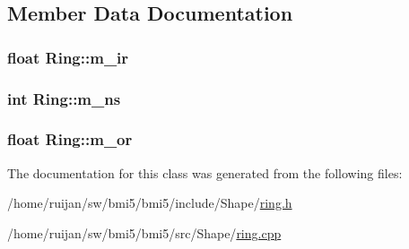 \subsection{Member Data Documentation}
\hypertarget{classRing_a5e4deb45ebf263e2a518d06df7f00afd}{
\subsubsection[{m\-\_\-ir}]{\setlength{\rightskip}{0pt plus 5cm}float Ring\-::m\-\_\-ir\hspace{0.3cm}{\ttfamily [private]}}}\label{classRing_a5e4deb45ebf263e2a518d06df7f00afd}
\hypertarget{classRing_af2929b1d85186201b9325998d541d204}{
\subsubsection[{m\-\_\-ns}]{\setlength{\rightskip}{0pt plus 5cm}int Ring\-::m\-\_\-ns\hspace{0.3cm}{\ttfamily [private]}}}\label{classRing_af2929b1d85186201b9325998d541d204}
\hypertarget{classRing_a4686fdcc73450cc4cb29dcd97908652c}{
\subsubsection[{m\-\_\-or}]{\setlength{\rightskip}{0pt plus 5cm}float Ring\-::m\-\_\-or\hspace{0.3cm}{\ttfamily [private]}}}\label{classRing_a4686fdcc73450cc4cb29dcd97908652c}


The documentation for this class was generated from the following files\-:\begin{DoxyCompactItemize}
\item 
/home/ruijan/sw/bmi5/bmi5/include/\-Shape/\hyperlink{ring_8h}{ring.\-h}\item 
/home/ruijan/sw/bmi5/bmi5/src/\-Shape/\hyperlink{ring_8cpp}{ring.\-cpp}\end{DoxyCompactItemize}
